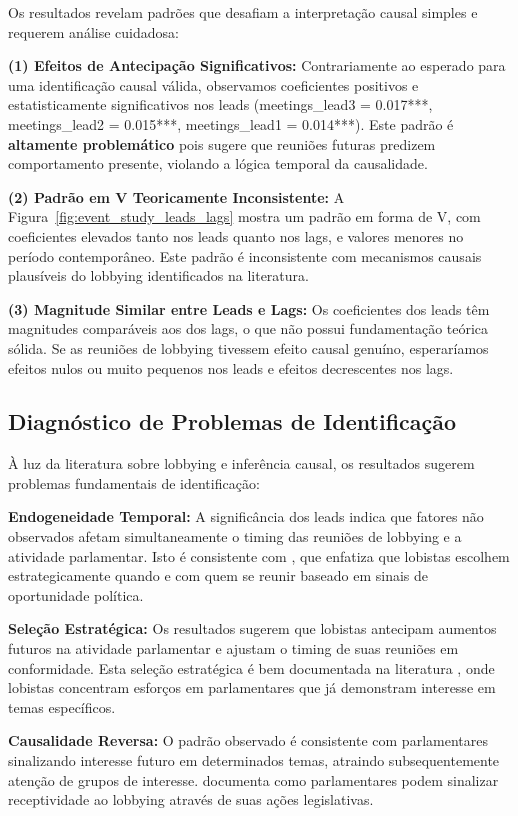 Os resultados revelam padrões que desafiam a interpretação causal simples e requerem análise cuidadosa:

\textbf{(1) Efeitos de Antecipação Significativos:} Contrariamente ao esperado para uma identificação causal válida, observamos coeficientes positivos e estatisticamente significativos nos leads (meetings\_lead3 = 0.017***, meetings\_lead2 = 0.015***, meetings\_lead1 = 0.014***). Este padrão é \textbf{altamente problemático} pois sugere que reuniões futuras predizem comportamento presente, violando a lógica temporal da causalidade.

\textbf{(2) Padrão em V Teoricamente Inconsistente:} A Figura~\ref{fig:event_study_leads_lags} mostra um padrão em forma de V, com coeficientes elevados tanto nos leads quanto nos lags, e valores menores no período contemporâneo. Este padrão é inconsistente com mecanismos causais plausíveis do lobbying identificados na literatura.

\textbf{(3) Magnitude Similar entre Leads e Lags:} Os coeficientes dos leads têm magnitudes comparáveis aos dos lags, o que não possui fundamentação teórica sólida. Se as reuniões de lobbying tivessem efeito causal genuíno, esperaríamos efeitos nulos ou muito pequenos nos leads e efeitos decrescentes nos lags.

\subsection{Diagnóstico de Problemas de Identificação}

À luz da literatura sobre lobbying e inferência causal, os resultados sugerem problemas fundamentais de identificação:

\textbf{Endogeneidade Temporal:} A significância dos leads indica que fatores não observados afetam simultaneamente o timing das reuniões de lobbying e a atividade parlamentar. Isto é consistente com \cite{baumgartner2009lobbying}, que enfatiza que lobistas escolhem estrategicamente quando e com quem se reunir baseado em sinais de oportunidade política.

\textbf{Seleção Estratégica:} Os resultados sugerem que lobistas antecipam aumentos futuros na atividade parlamentar e ajustam o timing de suas reuniões em conformidade. Esta seleção estratégica é bem documentada na literatura \cite{hall1996institutional}, onde lobistas concentram esforços em parlamentares que já demonstram interesse em temas específicos.

\textbf{Causalidade Reversa:} O padrão observado é consistente com parlamentares sinalizando interesse futuro em determinados temas, atraindo subsequentemente atenção de grupos de interesse. \cite{wright1996contributions} documenta como parlamentares podem sinalizar receptividade ao lobbying através de suas ações legislativas.


